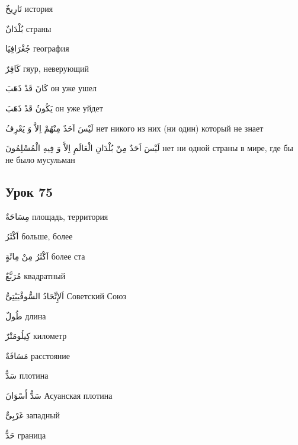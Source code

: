 \documentclass[a5paper]{article}
\newcommand\textstyleDropCaps[1]{#1}
\newcommand\textstyleCaptioncharacters[1]{#1}
\begin{document}
\textstyleCaptioncharacters{تَارِيخٌ }\textstyleDropCaps{история‎}

\textstyleCaptioncharacters{بُلْدَانٌ }\textstyleDropCaps{страны‎}

\textstyleCaptioncharacters{جُغْرَافِيَا }\textstyleDropCaps{география‎}

\textstyleCaptioncharacters{كَافِرٌ }\textstyleDropCaps{гяур, неверующий‎}

\textstyleCaptioncharacters{كَانَ قَدْ ذَهَبَ }\textstyleDropCaps{он уже ушел‎}

\textstyleCaptioncharacters{يَكُونُ قَدْ ذَهَبَ }\textstyleDropCaps{он уже уйдет‎}

\textstyleCaptioncharacters{لَيْسَ اَحَدٌ مِنْهُمْ اِلاَّ وَ يَعْرِفُ }\textstyleDropCaps{нет никого из них (ни один) который не знает‎}

\textstyleCaptioncharacters{لَيْسَ اَحَدٌ مِنْ بُلْدَانِ الْعَالَمِ اِلاَّ وَ فِيهِ الْمُسْلِمُونَ }\textstyleDropCaps{нет ни одной страны в мире, где бы не было мусульман‎}

\subsection[Урок 75‎]{\textstyleDropCaps{Урок 75‎}}
\textstyleCaptioncharacters{مِسَاحَةٌ }\textstyleDropCaps{площадь, терри­тория‎}

\textstyleCaptioncharacters{اَكْثَرُ }\textstyleDropCaps{больше, более‎}

\textstyleCaptioncharacters{اَكْثَرُ مِنْ مِائَةٍ }\textstyleDropCaps{более ста‎}

\textstyleCaptioncharacters{مُرَبَّعٌ }\textstyleDropCaps{квадратный‎}

\textstyleCaptioncharacters{اَلإِتِّحَادُ السُّوفْيَيْتِىُّ }\textstyleDropCaps{Советский Союз‎}

\textstyleCaptioncharacters{طُولٌ }\textstyleDropCaps{длина‎}

\textstyleCaptioncharacters{كِيلُومَتْرٌ }\textstyleDropCaps{километр‎}

\textstyleCaptioncharacters{مَسَافَةٌ }\textstyleDropCaps{расстояние‎}

\textstyleCaptioncharacters{سَدٌّ }\textstyleDropCaps{плотина‎}

\textstyleCaptioncharacters{سَدُّ أَسْوَانَ }\textstyleDropCaps{Асуанская плотина‎}

\textstyleCaptioncharacters{غَرْبِىٌّ }\textstyleDropCaps{западный‎}

\textstyleCaptioncharacters{حَدٌّ }\textstyleDropCaps{граница‎}
\end{document}
